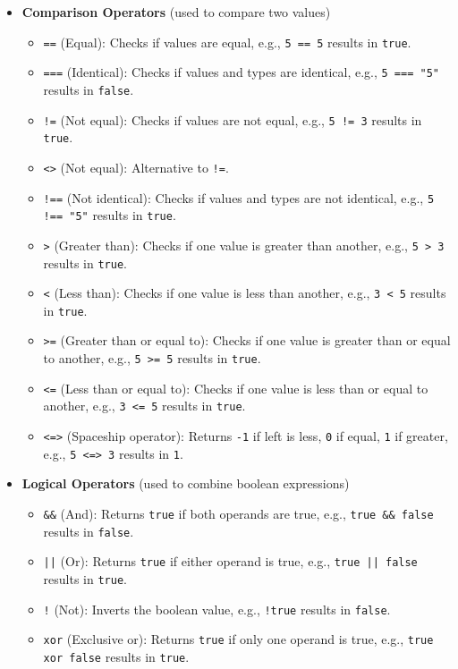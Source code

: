 \documentclass{report}
\begin{document}
\begin{itemize}
\begin{itemize}
                \item \textbf{Comparison Operators} (used to compare two values)
                    \begin{itemize}
                        \item \texttt{==} (Equal): Checks if values are equal, e.g., \texttt{5 == 5} results in \texttt{true}.
                        \item \texttt{===} (Identical): Checks if values and types are identical, e.g., \texttt{5 === "5"} results in \texttt{false}.
                        \item \texttt{!=} (Not equal): Checks if values are not equal, e.g., \texttt{5 != 3} results in \texttt{true}.
                        \item \texttt{<>} (Not equal): Alternative to \texttt{!=}.
                        \item \texttt{!==} (Not identical): Checks if values and types are not identical, e.g., \texttt{5 !== "5"} results in \texttt{true}.
                        \item \texttt{>} (Greater than): Checks if one value is greater than another, e.g., \texttt{5 > 3} results in \texttt{true}.
                        \item \texttt{<} (Less than): Checks if one value is less than another, e.g., \texttt{3 < 5} results in \texttt{true}.
                        \item \texttt{>=} (Greater than or equal to): Checks if one value is greater than or equal to another, e.g., \texttt{5 >= 5} results in \texttt{true}.
                        \item \texttt{<=} (Less than or equal to): Checks if one value is less than or equal to another, e.g., \texttt{3 <= 5} results in \texttt{true}.
                        \item \texttt{<=>} (Spaceship operator): Returns \texttt{-1} if left is less, \texttt{0} if equal, \texttt{1} if greater, e.g., \texttt{5 <=> 3} results in \texttt{1}.
                    \end{itemize}

                \item \textbf{Logical Operators} (used to combine boolean expressions)
                    \begin{itemize}
                        \item \texttt{\&\&} (And): Returns \texttt{true} if both operands are true, e.g., \texttt{true \&\& false} results in \texttt{false}.
                        \item \texttt{||} (Or): Returns \texttt{true} if either operand is true, e.g., \texttt{true || false} results in \texttt{true}.
                        \item \texttt{!} (Not): Inverts the boolean value, e.g., \texttt{!true} results in \texttt{false}.
                        \item \texttt{xor} (Exclusive or): Returns \texttt{true} if only one operand is true, e.g., \texttt{true xor false} results in \texttt{true}.
                    \end{itemize}


\end{itemize}
\end{itemize}
\end{document}
